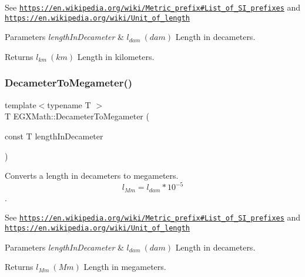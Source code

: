 See \href{https://en.wikipedia.org/wiki/Metric_prefix#List_of_SI_prefixes}{\tt https\+://en.\+wikipedia.\+org/wiki/\+Metric\+\_\+prefix\#\+List\+\_\+of\+\_\+\+S\+I\+\_\+prefixes} and \href{https://en.wikipedia.org/wiki/Unit_of_length}{\tt https\+://en.\+wikipedia.\+org/wiki/\+Unit\+\_\+of\+\_\+length} 
\begin{DoxyParams}{Parameters}
{\em length\+In\+Decameter} & $ l_{dam}\ (dam)$ Length in decameters. \\
\hline
\end{DoxyParams}
\begin{DoxyReturn}{Returns}
$ l_{km}\ (km)$ Length in kilometers. 
\end{DoxyReturn}
\mbox{\label{group___e_g_x_math-_conversions-_length_conversions-_s_i-_decameter-_s_i_ga84e31290bf0886972b10479e4fd37fb4}} 
\subsubsection{\texorpdfstring{Decameter\+To\+Megameter()}{DecameterToMegameter()}}
{\footnotesize\ttfamily template$<$typename T $>$ \\
T E\+G\+X\+Math\+::\+Decameter\+To\+Megameter (\begin{DoxyParamCaption}\item[{const T}]{length\+In\+Decameter }\end{DoxyParamCaption})}



Converts a length in decameters to megameters. \[ l_{Mm}=l_{dam} * 10^{-5} \]. 

See \href{https://en.wikipedia.org/wiki/Metric_prefix#List_of_SI_prefixes}{\tt https\+://en.\+wikipedia.\+org/wiki/\+Metric\+\_\+prefix\#\+List\+\_\+of\+\_\+\+S\+I\+\_\+prefixes} and \href{https://en.wikipedia.org/wiki/Unit_of_length}{\tt https\+://en.\+wikipedia.\+org/wiki/\+Unit\+\_\+of\+\_\+length} 
\begin{DoxyParams}{Parameters}
{\em length\+In\+Decameter} & $ l_{dam}\ (dam)$ Length in decameters. \\
\hline
\end{DoxyParams}
\begin{DoxyReturn}{Returns}
$ l_{Mm}\ (Mm)$ Length in megameters. 
\end{DoxyReturn}
\mbox{\label{group___e_g_x_math-_conversions-_length_conversions-_s_i-_decameter-_s_i_gac7f762a09c6496efaab29ecdbfb88a2c}} 
